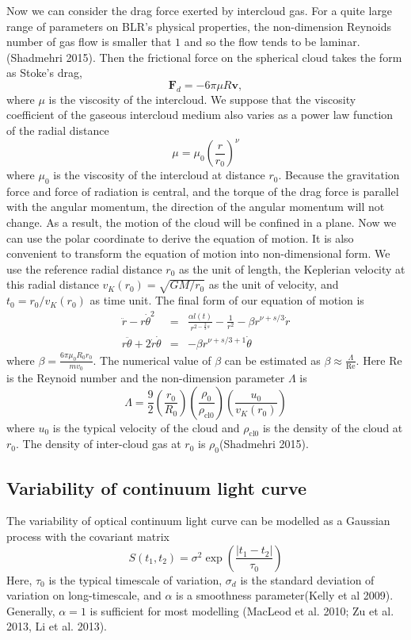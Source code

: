 \documentclass{article}
\begin{document}
Now we can consider the drag force exerted by intercloud gas. For a quite large range of parameters on BLR's physical properties, the non-dimension Reynoids number of gas flow is smaller that $1$ and so the flow tends to be laminar.(Shadmehri 2015). Then the frictional force on the spherical cloud takes the form as Stoke's drag,
\[\mathbf{F}_d = -6\pi \mu R \mathbf{v},\]
where $\mu$ is the viscosity of the intercloud. We suppose that the viscosity coefficient of the gaseous intercloud medium also varies as a power law function of the radial distance
\[\mu = \mu_0 \left( \frac{r}{r_0}\right)^{\nu}\]
where $\mu_0$ is the viscosity of the intercloud at distance $r_0$. 
Because the gravitation force and force of radiation is central, and the torque of the drag force is parallel with the angular momentum, the direction of the angular momentum will not change. As a result, the motion of the cloud will be confined in a plane. Now we can use the polar coordinate to derive the equation of motion. It is also convenient to transform the equation of motion into non-dimensional form. We use the reference radial distance $r_0$ as the unit of length, the Keplerian velocity at this radial distance $v_K(r_0) = \sqrt{GM/r_0}$ as the unit of velocity, and $t_0 = r_0/v_K(r_0)$ as  time unit. The final form of our equation of motion is
\begin{eqnarray}
\ddot{r} - r \dot{\theta}^2 &=& \frac{\alpha l(t)}{r^{2-\frac{2}{3}s}}  -\frac{1}{r^2} - \beta r^{\nu + s/3}\dot{r} \nonumber \\
r\ddot{\theta} + 2\dot{r}\dot{\theta} &=& -\beta r^{\nu + s/3 +1} \dot{\theta} \nonumber
\end{eqnarray}
where $\beta = \frac{6\pi\mu_0R_0r_0}{mv_0}$. The numerical value of $\beta$ can be estimated as $\beta \approx \frac{\Lambda}{\mathrm{Re}}$. Here $\mathrm{Re}$ is the Reynoid number and the non-dimension parameter $\Lambda$ is
\[\Lambda = \frac{9}{2} \left( \frac{r_0}{R_0}\right) \left( \frac{\rho_{0}}{\rho_{\mathrm{cl}0}}\right) \left( \frac{u_0}{v_K(r_0)} \right)\]
where $u_0$ is the typical velocity of the cloud and $\rho_{\mathrm{cl}0}$ is the density of the cloud at $r_0$. The density of inter-cloud gas at $r_0$ is $\rho_0$(Shadmehri 2015). 

\subsection{Variability of continuum light curve}
The variability of optical continuum light curve can be modelled as a Gaussian process with the covariant matrix
\[S(t_1,t_2) = \sigma^2 \exp(\frac{|t_1-t_2|}{\tau_0})\]
Here, $\tau_0$ is the typical timescale of variation, $\sigma_d$ is the standard deviation of variation on long-timescale, and $\alpha$ is a smoothness parameter(Kelly et al 2009). Generally, $\alpha =1$ is sufficient for most modelling (MacLeod et al. 2010; Zu et al. 2013, Li et al. 2013). 
\end{document}
